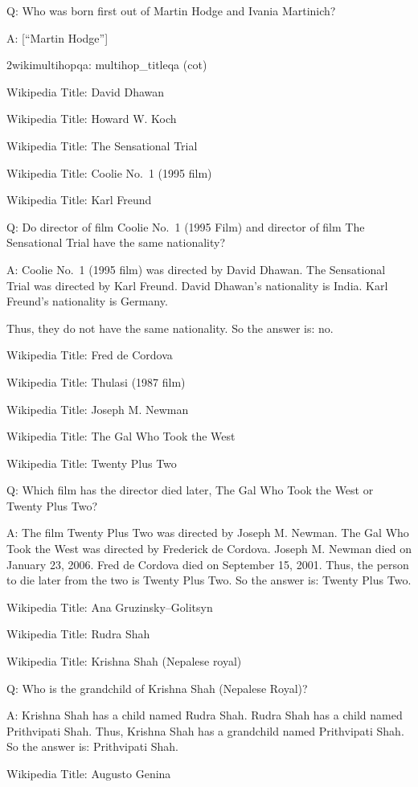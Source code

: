 \documentclass[
]{article}
\begin{document}
Q: Who was born first out of Martin Hodge and Ivania Martinich?

A: {[}``Martin Hodge''{]}

2wikimultihopqa: multihop\_titleqa (cot)

Wikipedia Title: David Dhawan

Wikipedia Title: Howard W. Koch

Wikipedia Title: The Sensational Trial

Wikipedia Title: Coolie No.~1 (1995 film)

Wikipedia Title: Karl Freund

Q: Do director of film Coolie No.~1 (1995 Film) and director of film The
Sensational Trial have the same nationality?

A: Coolie No.~1 (1995 film) was directed by David Dhawan. The
Sensational Trial was directed by Karl Freund. David Dhawan's
nationality is India. Karl Freund's nationality is Germany.

Thus, they do not have the same nationality. So the answer is: no.

Wikipedia Title: Fred de Cordova

Wikipedia Title: Thulasi (1987 film)

Wikipedia Title: Joseph M. Newman

Wikipedia Title: The Gal Who Took the West

Wikipedia Title: Twenty Plus Two

Q: Which film has the director died later, The Gal Who Took the West or
Twenty Plus Two?

A: The film Twenty Plus Two was directed by Joseph M. Newman. The Gal
Who Took the West was directed by Frederick de Cordova. Joseph M. Newman
died on January 23, 2006. Fred de Cordova died on September 15, 2001.
Thus, the person to die later from the two is Twenty Plus Two. So the
answer is: Twenty Plus Two.

Wikipedia Title: Ana Gruzinsky--Golitsyn

Wikipedia Title: Rudra Shah

Wikipedia Title: Krishna Shah (Nepalese royal)

Q: Who is the grandchild of Krishna Shah (Nepalese Royal)?

A: Krishna Shah has a child named Rudra Shah. Rudra Shah has a child
named Prithvipati Shah. Thus, Krishna Shah has a grandchild named
Prithvipati Shah. So the answer is: Prithvipati Shah.

Wikipedia Title: Augusto Genina
\end{document}
